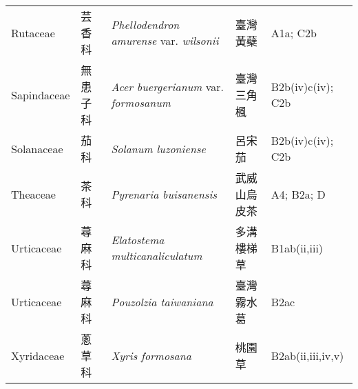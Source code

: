 {\begin{longtable}{p{2.5cm}p{2.5cm}p{4.5cm}p{2.5cm}p{3cm}}
    Rutaceae & 芸香科 & \textit{Phellodendron amurense} var. \textit{wilsonii}  & 臺灣黃蘗 & A1a; C2b \index{Phellodendron@\textit{Phellodendron}!amurense@\textit{amurense}!var. wilsonii@var. \textit{wilsonii}}  \index{臺灣黃蘗} \\
    Sapindaceae & 無患子科 & \textit{Acer buergerianum} var. \textit{formosanum}  & 臺灣三角楓 & B2b(iv)c(iv); C2b \index{Acer@\textit{Acer}!buergerianum@\textit{buergerianum}!var. formosanum@var. \textit{formosanum}}  \index{臺灣三角楓} \\
    Solanaceae & 茄科 & \textit{Solanum luzoniense}  & 呂宋茄 & B2b(iv)c(iv); C2b \index{Solanum@\textit{Solanum}!luzoniense@\textit{luzoniense}}  \index{呂宋茄} \\
    Theaceae & 茶科 & \textit{Pyrenaria buisanensis}  & 武威山烏皮茶 & A4; B2a; D \index{Pyrenaria@\textit{Pyrenaria}!buisanensis@\textit{buisanensis}}  \index{武威山烏皮茶} \\
    Urticaceae & 蕁麻科 & \textit{Elatostema multicanaliculatum}  & 多溝樓梯草 & B1ab(ii,iii) \index{Elatostema@\textit{Elatostema}!multicanaliculatum@\textit{multicanaliculatum}}  \index{多溝樓梯草} \\
    Urticaceae & 蕁麻科 & \textit{Pouzolzia taiwaniana}  & 臺灣霧水葛 & B2ac \index{Pouzolzia@\textit{Pouzolzia}!taiwaniana@\textit{taiwaniana}}  \index{臺灣霧水葛} \\
    Xyridaceae & 蔥草科 & \textit{Xyris formosana}  & 桃園草 & B2ab(ii,iii,iv,v) \index{Xyris@\textit{Xyris}!formosana@\textit{formosana}}  \index{桃園草} \\
    \bottomrule
        \end{longtable}
        }
    